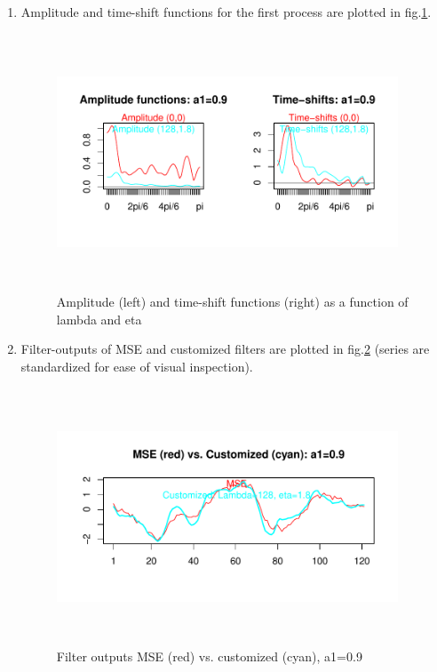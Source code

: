 \documentclass[a4paper]{book}
\begin{document}
\begin{enumerate}
\item Amplitude and time-shift functions for the first process are plotted in fig.\ref{z_box_plot_amp_and_shift_cust_ST_1}.
\begin{figure}[H]\begin{center}\includegraphics[height=3in, width=4in]{z_box_plot_amp_and_shift_cust_ST_1}\caption{Amplitude (left) and time-shift functions (right) as a function of lambda and eta\label{z_box_plot_amp_and_shift_cust_ST_1}}\end{center}\end{figure}\item Filter-outputs of MSE and customized  filters are plotted in fig.\ref{z_dfa_cust_ats_out_1_ST} (series are standardized for ease of visual inspection).
\begin{figure}[H]\begin{center}\includegraphics[height=3in, width=4in]{z_dfa_cust_ats_out_1_ST}\caption{Filter outputs MSE (red) vs. customized (cyan), a1=0.9\label{z_dfa_cust_ats_out_1_ST}}\end{center}\end{figure}

\end{enumerate}
\end{document}
